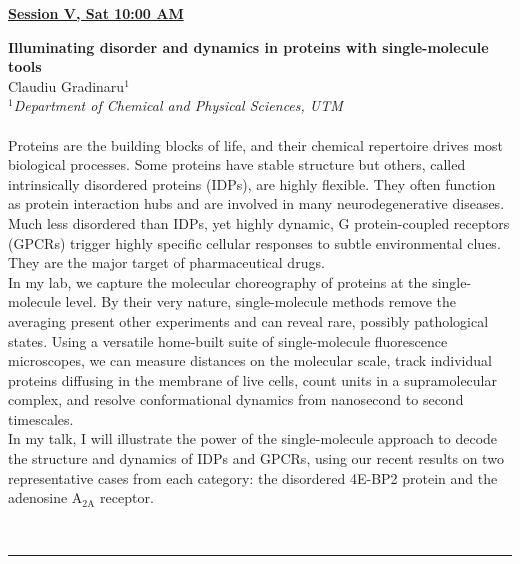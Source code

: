 \documentclass[titlepage,oneside,openany,10pt]{book}
\newenvironment{oralabs}[4] %
        {
        \begin{flushright}
                \underline{\textbf{#4}}
        \end{flushright}
        \textbf{#1}\\%
        #2\\%
        \textit{#3}\\\\%
        }
        {
        \\
        \noindent\rule{15cm}{0.5pt}%
        }
\begin{document}
\begin{oralabs}
    {Illuminating disorder and dynamics in proteins with single-molecule tools}
    {Claudiu Gradinaru$^{1}$}
    {
    $^1$Department of Chemical and Physical Sciences, UTM
    }
    {Session V, Sat 10:00 AM}
	Proteins are the building blocks of life, and their chemical repertoire drives most biological processes. Some proteins have stable structure but others, called intrinsically disordered proteins (IDPs), are highly flexible. They often function as protein interaction hubs and are involved in many neurodegenerative diseases. Much less disordered than IDPs, yet highly dynamic, G protein-coupled receptors (GPCRs) trigger highly specific cellular responses to subtle environmental clues. They are the major target of pharmaceutical drugs.\\
	In my lab, we capture the molecular choreography of proteins at the single-molecule level. By their very nature, single-molecule methods remove the averaging present other experiments and can reveal rare, possibly pathological states. Using a versatile home-built suite of single-molecule fluorescence microscopes, we can measure distances on the molecular scale, track individual proteins diffusing in the membrane of live cells, count units in a supramolecular complex, and resolve conformational dynamics from nanosecond to second timescales.\\
	In my talk, I will illustrate the power of the single-molecule approach to decode the structure and dynamics of IDPs and GPCRs, using our recent results on two representative cases from each category: the disordered 4E-BP2 protein and the adenosine $\mathrm{A_{2A}}$ receptor.
	\label{GradinaruC}
\end{oralabs}

\newpage
\end{document}
